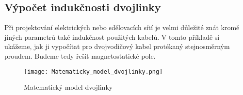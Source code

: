 \documentclass[a4paper, oneside]{article}
\begin{document}
\subsection{Výpočet indukčnosti dvojlinky}
Při projektování elektrických nebo sdělovacích sítí je velmi důležité znát kromě jiných parametrů také indukčnost použitých kabelů. V tomto příkladě si ukážeme, jak ji vypočítat pro dvojvodičový kabel protékaný stejnosměrným proudem. Budeme tedy řešit magnetostatické pole.\\

\begin{figure}[htbp]
\centering
\texttt{[image: Matematicky\_model\_dvojlinky.png]}\\
\caption{Matematický model dvojlinky}
\end{figure}
\end{document}
